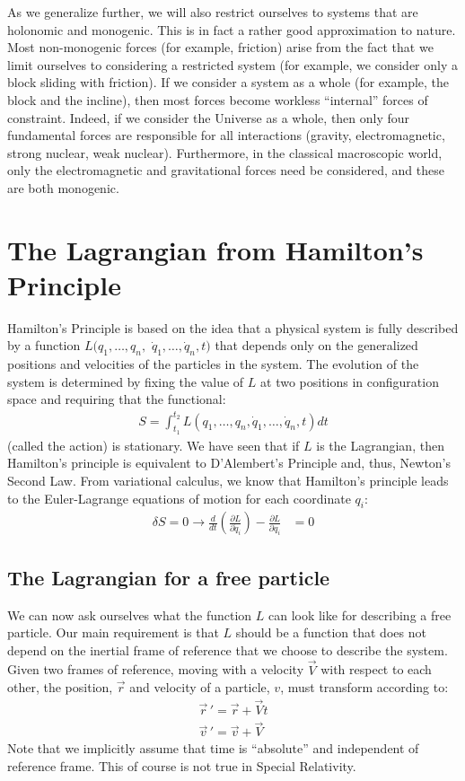 As we generalize further, we will also restrict ourselves to systems that are holonomic and monogenic. This is in fact a rather good approximation to nature. Most non-monogenic forces (for example, friction) arise from the fact that we limit ourselves to considering a restricted system (for example, we consider only a block sliding with friction). If we consider a system as a whole (for example, the block and the incline), then most forces become workless ``internal'' forces of constraint. Indeed, if we consider the Universe as a whole, then only four fundamental forces are responsible for all interactions (gravity, electromagnetic, strong nuclear, weak nuclear). Furthermore, in the classical macroscopic world, only the electromagnetic and gravitational forces need be considered, and these are both monogenic.

\section{The Lagrangian from Hamilton's Principle}
Hamilton's Principle is based on the idea that a physical system is fully described by a function $L(q_1,\dots ,q_n,$ $\dot{q}_1,\dots ,\dot{q}_n,t)$ that depends only on the generalized positions and velocities of the particles in the system. The evolution of the system is determined by fixing the value of $L$ at two positions in configuration space and requiring that the functional:
\begin{align}
S=\int_{t_1}^{t_2} L(q_1,\dots ,q_n,\dot{q}_1,\dots ,\dot{q}_n,t) dt
\end{align}
(called the action) is stationary. We have seen that if $L$ is the Lagrangian, then Hamilton's principle is equivalent to D'Alembert's Principle and, thus, Newton's Second Law. From variational calculus, we know that Hamilton's principle leads to the Euler-Lagrange equations of motion for each coordinate $q_i$:
\begin{align}
\delta S=0\to\frac{d}{dt}\left(\frac{\partial L}{\partial \dot{q}_i} \right) - \frac{\partial L}{\partial q_i}&=0
\end{align}
\subsection{The Lagrangian for a free particle}
We can now ask ourselves what the function $L$ can look like for describing a free particle. Our main requirement is that $L$ should be a function that does not depend on the inertial frame of reference that we choose to describe the system. Given two frames of reference, moving with a velocity $\vec{V}$ with respect to each other, the position, $\vec{r}$ and velocity of a particle, $v$, must transform according to:
\begin{align}
\vec{r}\,'=\vec{r}+\vec{V}t\nonumber\\
\vec{v}\,'=\vec{v}+\vec{V}
\end{align}
Note that we implicitly assume that time is ``absolute'' and independent of reference frame. This of course is not true in Special Relativity.

